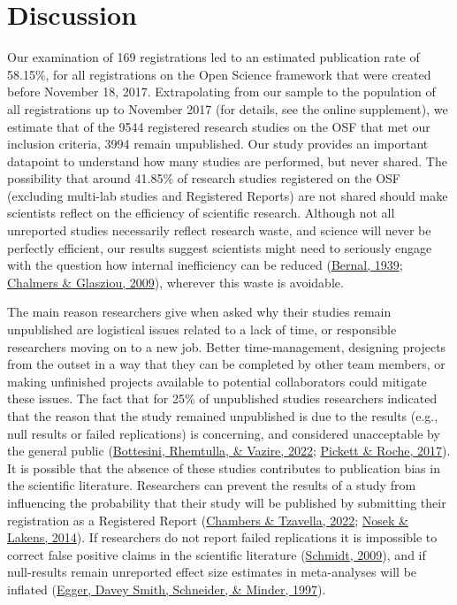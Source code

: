 \documentclass[
  ,jou, a4paper,floatsintext]{apa6}
\begin{document}
\hypertarget{discussion}{%
\section{Discussion}\label{discussion}}

Our examination of 169 registrations led to an estimated publication rate of 58.15\%, for all registrations on the Open Science framework that were created before November 18, 2017. Extrapolating from our sample to the population of all registrations up to November 2017 (for details, see the online supplement), we estimate that of the 9544 registered research studies on the OSF that met our inclusion criteria, 3994 remain unpublished. Our study provides an important datapoint to understand how many studies are performed, but never shared. The possibility that around 41.85\% of research studies registered on the OSF (excluding multi-lab studies and Registered Reports) are not shared should make scientists reflect on the efficiency of scientific research. Although not all unreported studies necessarily reflect research waste, and science will never be perfectly efficient, our results suggest scientists might need to seriously engage with the question how internal inefficiency can be reduced (\protect\hyperlink{ref-bernal_social_1939}{Bernal, 1939}; \protect\hyperlink{ref-chalmers_avoidable_2009}{Chalmers \& Glasziou, 2009}), wherever this waste is avoidable.

The main reason researchers give when asked why their studies remain unpublished are logistical issues related to a lack of time, or responsible researchers moving on to a new job. Better time-management, designing projects from the outset in a way that they can be completed by other team members, or making unfinished projects available to potential collaborators could mitigate these issues. The fact that for 25\% of unpublished studies researchers indicated that the reason that the study remained unpublished is due to the results (e.g., null results or failed replications) is concerning, and considered unacceptable by the general public (\protect\hyperlink{ref-bottesini_what_2022}{Bottesini, Rhemtulla, \& Vazire, 2022}; \protect\hyperlink{ref-pickett_questionable_2017}{Pickett \& Roche, 2017}). It is possible that the absence of these studies contributes to publication bias in the scientific literature. Researchers can prevent the results of a study from influencing the probability that their study will be published by submitting their registration as a Registered Report (\protect\hyperlink{ref-chambers_past_2022}{Chambers \& Tzavella, 2022}; \protect\hyperlink{ref-nosek_registered_2014}{Nosek \& Lakens, 2014}). If researchers do not report failed replications it is impossible to correct false positive claims in the scientific literature (\protect\hyperlink{ref-schmidt_shall_2009}{Schmidt, 2009}), and if null-results remain unreported effect size estimates in meta-analyses will be inflated (\protect\hyperlink{ref-egger_bias_1997}{Egger, Davey Smith, Schneider, \& Minder, 1997}).
\end{document}
